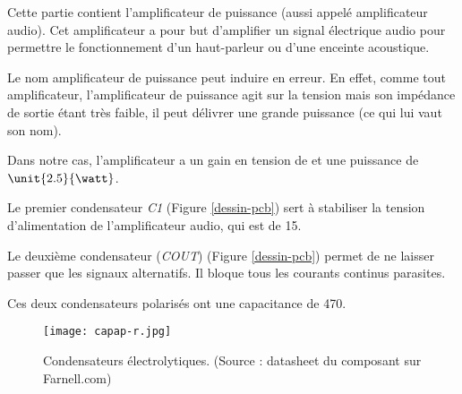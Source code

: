 Cette partie contient l'amplificateur de puissance (aussi appelé amplificateur audio). 
Cet amplificateur a pour but d'amplifier un signal électrique audio pour
permettre le fonctionnement d'un haut-parleur ou d'une enceinte acoustique.

Le nom amplificateur de puissance peut induire en erreur. En effet, comme tout amplificateur,
l'amplificateur de puissance agit sur la tension mais son impédance de sortie étant très faible,
il peut délivrer une grande puissance (ce qui lui vaut son nom).

Dans notre cas, l'amplificateur a un gain en tension de  et une puissance de $\unit
{2.5}{\watt}$.

Le premier condensateur \textit{C1} (Figure \ref{dessin-pcb}) sert à stabiliser la tension 
d'alimentation de l'amplificateur audio, qui est de \unit{15}{\volt}. 

Le deuxième condensateur (\textit{COUT}) (Figure \ref{dessin-pcb}) permet de ne laisser passer 
que les signaux alternatifs. Il bloque tous les courants continus parasites.

Ces deux condensateurs polarisés ont une capacitance de \unit{470}{\micro\farad}. 

\begin{figure}[!htb]
	\centering
	\texttt{[image: capap-r.jpg]}
	\caption{Condensateurs électrolytiques. (Source : datasheet du composant sur Farnell.com)}
\end{figure}

